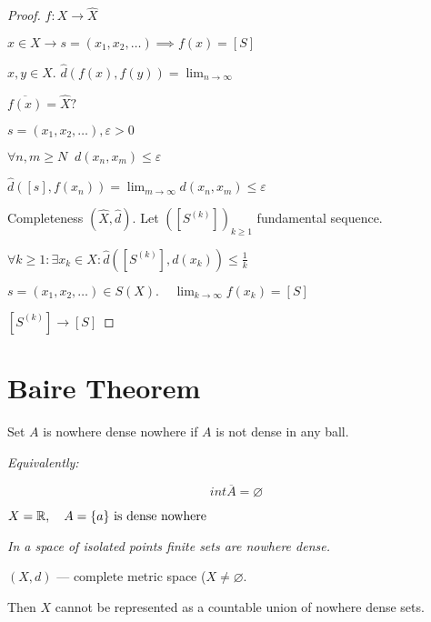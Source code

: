 \begin{proof}
    $f: X \to  \hat{X}$


    $x \in  X \to  s = (x_1, x_2, \ldots) \implies f(x) = [S]$

    $x, y \in  X$. $\hat{d}(f(x), f(y)) = \lim_{n \to \infty} $

    $\overline{f(x)} = \hat{X} ?$

    $s = (x_1, x_2, \ldots), \varepsilon > 0$


    $\forall n, m \ge  N \;\; d(x_{n}, x_{m}) \le  \varepsilon$

    $\hat{d}([s], f(x_{n})) = \lim_{m \to \infty} d(x_{n}, x_{m}) \le  \varepsilon$

    Completeness $(\hat{X}, \hat{d}) $. Let $([S^{(k)}])_{k\ge 1}$ fundamental sequence.

    $\forall k \ge  1 : \exists x_k \in  X : \hat{d} ([S^{(k)}], d(x_k)) \le  \frac{1}{k}$

    $s = (x_1, x_2, \ldots) \in  S(X). \;\;\;\; \lim_{k \to \infty} f(x_k) = [S]$

    $[S^{(k)}] \to  [S]$

\end{proof}

\hr

\section{Baire Theorem}

\begin{definition}
  Set $A$ is nowhere dense nowhere if $A$ is not dense in any ball.

  \textit{Equivalently:}

  \[ int \overline{A} = \varnothing \]
\end{definition}

\begin{example}
  $X = \mathbb{R}, \quad A = \{a\} \text{ is dense nowhere }$

  \textit{In a space of isolated points finite sets are nowhere dense.}
\end{example}

\begin{theorem}[Baire]

$(X,d)$ --- complete metric space ($X \neq \varnothing$.

Then $X$ cannot be represented as a countable union of nowhere dense sets.
  
\end{theorem}

